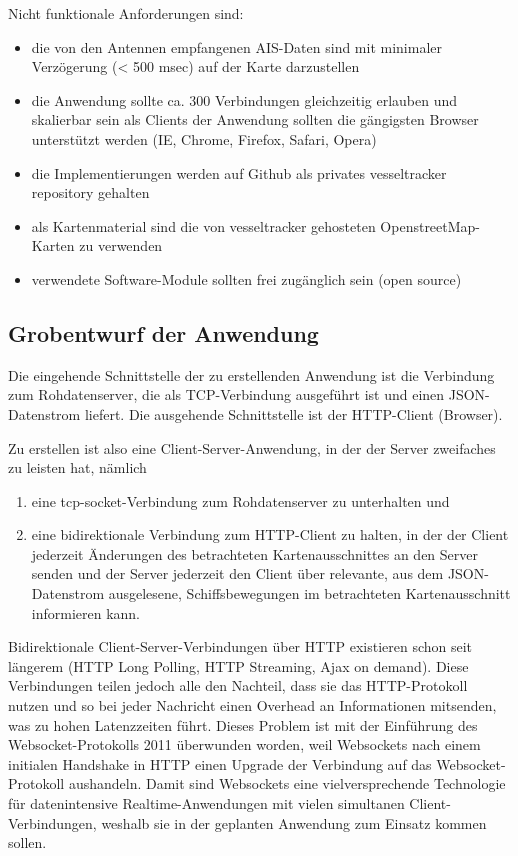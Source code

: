 Nicht funktionale Anforderungen sind:
\begin{itemize}
\item die von den Antennen empfangenen AIS-Daten sind mit minimaler Verzögerung (< 500 msec) auf der Karte darzustellen
\item die Anwendung sollte ca. 300 Verbindungen gleichzeitig erlauben und skalierbar sein
als Clients der Anwendung sollten die gängigsten Browser unterstützt werden (IE, Chrome, Firefox, Safari, Opera) 
\item die Implementierungen werden auf Github als privates vesseltracker repository gehalten
\item als Kartenmaterial sind die von vesseltracker gehosteten OpenstreetMap-Karten zu verwenden
\item verwendete Software-Module sollten frei zugänglich sein (open source) 
\end{itemize}

\subsection{Grobentwurf der Anwendung}\label{s.Grobentwurf der Anwendung}
Die eingehende Schnittstelle der zu erstellenden Anwendung ist die Verbindung zum Rohdatenserver, die als TCP-Verbindung ausgeführt ist und einen JSON-Datenstrom liefert.
Die ausgehende Schnittstelle ist der HTTP-Client (Browser).

Zu erstellen ist also eine Client-Server-Anwendung, in der der Server zweifaches zu leisten hat, nämlich 
\begin{enumerate}
 \item eine tcp-socket-Verbindung zum Rohdatenserver zu unterhalten und
  \item eine bidirektionale Verbindung zum HTTP-Client zu halten, in der der Client jederzeit Änderungen des betrachteten Kartenausschnittes an den Server senden und der Server jederzeit den Client über relevante, aus dem JSON-Datenstrom ausgelesene, Schiffsbewegungen im betrachteten Kartenausschnitt informieren kann.
\end{enumerate}

Bidirektionale Client-Server-Verbindungen über HTTP existieren schon seit längerem (HTTP Long Polling, HTTP Streaming, Ajax on demand). Diese Verbindungen teilen jedoch alle den Nachteil, dass sie das HTTP-Protokoll nutzen und so bei jeder Nachricht einen Overhead an Informationen mitsenden, was zu hohen Latenzzeiten führt. Dieses Problem ist mit der Einführung des Websocket-Protokolls 2011 überwunden worden, weil Websockets nach einem initialen Handshake in HTTP einen Upgrade der Verbindung auf das Websocket-Protokoll aushandeln. 
Damit sind Websockets eine vielversprechende Technologie für datenintensive Realtime-Anwendungen mit vielen simultanen Client-Verbindungen, weshalb sie in der geplanten Anwendung zum Einsatz kommen sollen. 

